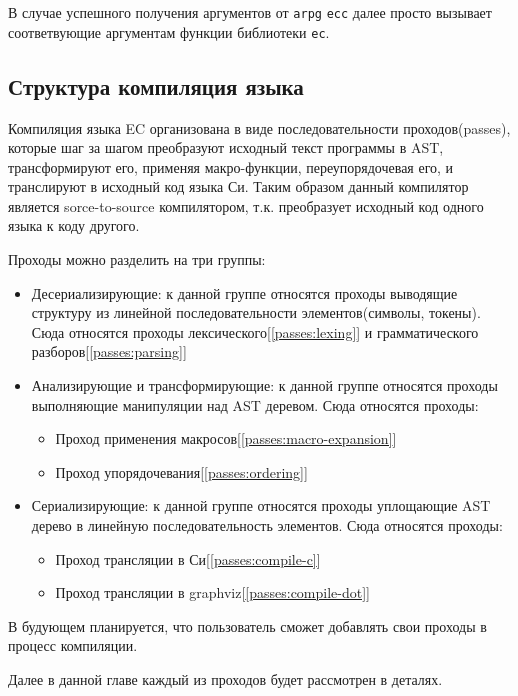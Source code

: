 В случае успешного получения аргументов от \verb|arpg| \verb|ecc| далее просто вызывает соответвующие аргументам функции библиотеки \verb|ec|.


\subsection*{Структура компиляция языка}
Компиляция языка EC организована в виде последовательности проходов(passes), которые шаг за шагом преобразуют исходный текст программы в AST, 
трансформируют его, применяя макро-функции, переупорядочевая его, и транслируют в исходный код языка Си. 
Таким образом данный компилятор является sorce-to-source компилятором, т.к. преобразует исходный код одного языка к коду другого.

Проходы можно разделить на три группы:
\begin{itemize}
    \item Десериализирующие: к данной группе относятся проходы выводящие структуру из линейной последовательности элементов(символы, токены). 
    Сюда относятся проходы лексического[\ref{passes:lexing}] и грамматического разборов[\ref{passes:parsing}]
    \item Анализирующие и трансформирующие: к данной группе относятся проходы выполняющие манипуляции над AST деревом. 
    Сюда относятся проходы:
    \begin{itemize}
        \item Проход применения макросов[\ref{passes:macro-expansion}]
        \item Проход упорядочевания[\ref{passes:ordering}]
    \end{itemize}
    \item Сериализирующие: к данной группе относятся проходы уплощающие AST дерево в линейную последовательность элементов.
    Сюда относятся проходы:
    \begin{itemize}
        \item Проход трансляции в Си[\ref{passes:compile-c}]
        \item Проход трансляции в graphviz[\ref{passes:compile-dot}]
    \end{itemize}
\end{itemize}

В будующем планируется, что пользователь сможет добавлять свои проходы в процесс компиляции.

Далее в данной главе каждый из проходов будет рассмотрен в деталях.







